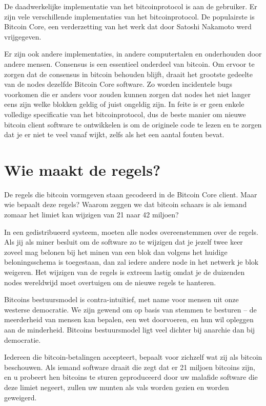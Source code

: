 De daadwerkelijke implementatie van het bitcoinprotocol is aan de gebruiker. Er zijn vele verschillende implementaties van het bitcoinprotocol. De populairste is Bitcoin Core, een verderzetting van het werk dat door Satoshi Nakamoto werd vrijgegeven.

Er zijn ook andere implementaties, in andere computertalen en onderhouden door andere mensen. Consensus is een essentieel onderdeel van bitcoin. Om ervoor te zorgen dat de consensus in bitcoin behouden blijft, draait het grootste gedeelte van de nodes dezelfde Bitcoin Core software. Zo worden incidentele bugs voorkomen die er anders voor zouden kunnen zorgen dat nodes het niet langer eens zijn welke blokken geldig of juist ongeldig zijn. In feite is er geen enkele volledige specificatie van het bitcoinprotocol, dus de beste manier om nieuwe bitcoin client software te ontwikkelen is om de originele code te lezen en te zorgen dat je er niet te veel vanaf wijkt, zelfs als het een aantal fouten bevat.

\section{Wie maakt de regels?}

De regels die bitcoin vormgeven staan gecodeerd in de Bitcoin Core client. Maar wie bepaalt deze regels? Waarom zeggen we dat bitcoin schaars is als iemand zomaar het limiet kan wijzigen van 21 naar 42 miljoen?

In een gedistribueerd systeem, moeten alle nodes overeenstemmen over de regels. Als jij als miner besluit om de software zo te wijzigen dat je jezelf twee keer zoveel mag belonen bij het minen van een blok dan volgens het huidige beloningsschema is toegestaan, dan zal iedere andere node in het netwerk je blok weigeren. Het wijzigen van de regels is extreem lastig omdat je de duizenden nodes wereldwijd moet overtuigen om de nieuwe regels te hanteren.

Bitcoins bestuursmodel is contra-intuïtief, met name voor mensen uit onze westerse democratie. We zijn gewend om op basis van stemmen te besturen -- de meerderheid van mensen kan bepalen, een wet doorvoeren, en hun wil opleggen aan de minderheid. Bitcoins bestuursmodel ligt veel dichter bij anarchie dan bij democratie.

Iedereen die bitcoin-betalingen accepteert, bepaalt voor zichzelf wat zij als bitcoin beschouwen. Als iemand software draait die zegt dat er 21 miljoen bitcoins zijn, en u probeert hen bitcoins te sturen geproduceerd door uw malafide software die deze limiet negeert, zullen uw munten als vals worden gezien en worden geweigerd.

